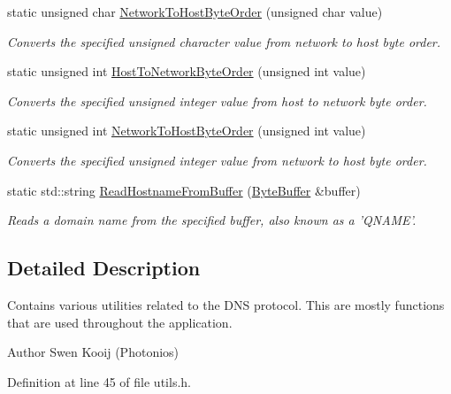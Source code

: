 \begin{DoxyCompactItemize}
static unsigned char \hyperlink{class_senergy_1_1_dns_1_1_utils_ac34288e7acfa54f6faaa775ab5654192}{Network\-To\-Host\-Byte\-Order} (unsigned char value)
\begin{DoxyCompactList}\small\item\em Converts the specified unsigned character value from network to host byte order. \end{DoxyCompactList}\item 
static unsigned int \hyperlink{class_senergy_1_1_dns_1_1_utils_a7a521aadbb12776e2127abe8028411dc}{Host\-To\-Network\-Byte\-Order} (unsigned int value)
\begin{DoxyCompactList}\small\item\em Converts the specified unsigned integer value from host to network byte order. \end{DoxyCompactList}\item 
static unsigned int \hyperlink{class_senergy_1_1_dns_1_1_utils_ad4711275abcbc1d332f3c0208e74c4b8}{Network\-To\-Host\-Byte\-Order} (unsigned int value)
\begin{DoxyCompactList}\small\item\em Converts the specified unsigned integer value from network to host byte order. \end{DoxyCompactList}\item 
static std\-::string \hyperlink{class_senergy_1_1_dns_1_1_utils_a6b995d31d85ef39a5e8ac57928fa35ed}{Read\-Hostname\-From\-Buffer} (\hyperlink{class_senergy_1_1_byte_buffer}{Byte\-Buffer} \&buffer)
\begin{DoxyCompactList}\small\item\em Reads a domain name from the specified buffer, also known as a 'Q\-N\-A\-M\-E'. \end{DoxyCompactList}\end{DoxyCompactItemize}


\subsection{Detailed Description}
Contains various utilities related to the D\-N\-S protocol. This are mostly functions that are used throughout the application. 

\begin{DoxyAuthor}{Author}
Swen Kooij (Photonios) 
\end{DoxyAuthor}


Definition at line 45 of file utils.\-h.




